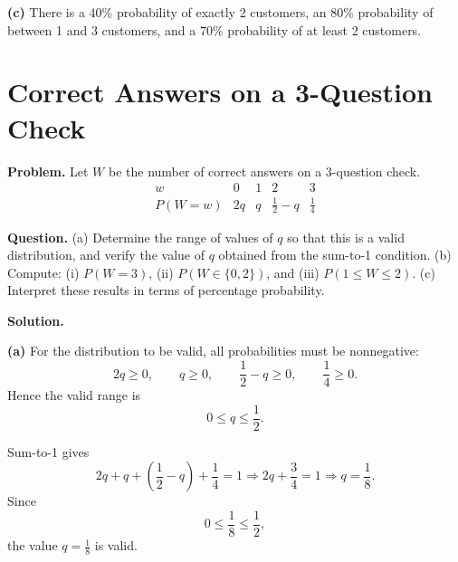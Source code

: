 		\textbf{(c)} There is a $40\%$ probability of exactly 2 customers, an $80\%$ probability of between 1 and 3 customers, and a $70\%$ probability of at least 2 customers.
		
		\section{Correct Answers on a 3-Question Check}
		
		\textbf{Problem.}
		Let $W$ be the number of correct answers on a 3-question check.
		\[
		\begin{array}{c|cccc}
			w & 0 & 1 & 2 & 3\\
			\hline
			P(W=w) & 2q & q & \frac{1}{2}-q & \frac{1}{4}
		\end{array}
		\]
		
		\textbf{Question.}
		(a) Determine the range of values of $q$ so that this is a valid distribution, and verify the value of $q$ obtained from the sum-to-1 condition.
		(b) Compute: (i) $P(W=3)$, (ii) $P(W\in\{0,2\})$, and (iii) $P(1\le W\le 2)$.
		(c) Interpret these results in terms of percentage probability.
		
		\textbf{Solution.}

		\textbf{(a)} For the distribution to be valid, all probabilities must be nonnegative:
		\[
		2q\ge 0,\qquad q\ge 0,\qquad \frac{1}{2}-q\ge 0,\qquad \frac{1}{4}\ge 0.
		\]
		Hence the valid range is
		\[
		0\le q\le \frac{1}{2}.
		\]
		
		Sum-to-1 gives
		\[
		2q+q+\left(\frac{1}{2}-q\right)+\frac{1}{4}=1
		\Rightarrow 2q+\frac{3}{4}=1
		\Rightarrow q=\frac{1}{8}.
		\]
		Since
		\[
		0\le \frac{1}{8}\le \frac{1}{2},
		\]
		the value $q=\frac{1}{8}$ is valid.
		

